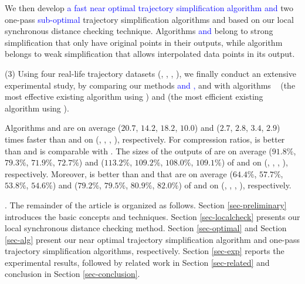  We then develop \textcolor{blue}{a fast near optimal trajectory simplification algorithm \cisto and} two one-pass \textcolor{blue}{sub-optimal} trajectory simplification algorithms \cist and \cista based on our local synchronous distance checking technique. 
Algorithms \textcolor{blue}{\cisto and} \cist belong to strong simplification that only have original points in their outputs, while algorithm \cista belongs to weak simplification that allows interpolated data points in its output.


\sstab (3) Using four real-life trajectory datasets (\truck, \sercar, \geolife, \pricar),
we finally conduct an extensive experimental study, by comparing our methods \textcolor{blue}{and \cisto,} \cist and \cista  with algorithms \dps~\cite{Meratnia:Spatiotemporal} (the most effective existing \lsa algorithm using \sed) and \squishe \cite{Muckell:Compression} (the most efficient existing \lsa algorithm using \sed).

Algorithms \cist and \cista are on average ($20.7$, $14.2$, $18.2$, $10.0$) and ($2.7$, $2.8$, $3.4$, {$2.9$}) times faster than \dps and \squishe on (\truck, \sercar, \geolife, \pricar), respectively.
%
For compression ratios, \cist is better than \squishe and is comparable with \dps. The sizes of the outputs of \cist are on average ($91.8\%$, $79.3\%$, $71.9\%$, {$72.7\%$}) and ($113.2\%$, $109.2\%$, $108.0\%$, $109.1\%$) of \squishe and \dps on (\truck, \sercar, \geolife, \pricar), respectively. Moreover, \cista is better than \squishe and \dps that are on average ($64.4\%$, $57.7\%$, $53.8\%$, {$54.6\%$}) and ($79.2\%$, $79.5\%$, $80.9\%$, $82.0\%$) of \squishe and \dps on (\truck, \sercar, \geolife, \pricar), respectively.


.
The remainder of the article is organized as follows.
Section \ref{sec-preliminary} introduces the basic concepts and techniques.
Section \ref{sec-localcheck} presents our local synchronous distance checking method.
Section \ref{sec-optimal} and Section \ref{sec-alg} present our near optimal trajectory simplification algorithm and one-pass trajectory simplification algorithms, respectively.
Section \ref{sec-exp} reports the experimental results, followed by related work in
Section \ref{sec-related} and conclusion in Section \ref{sec-conclusion}.





